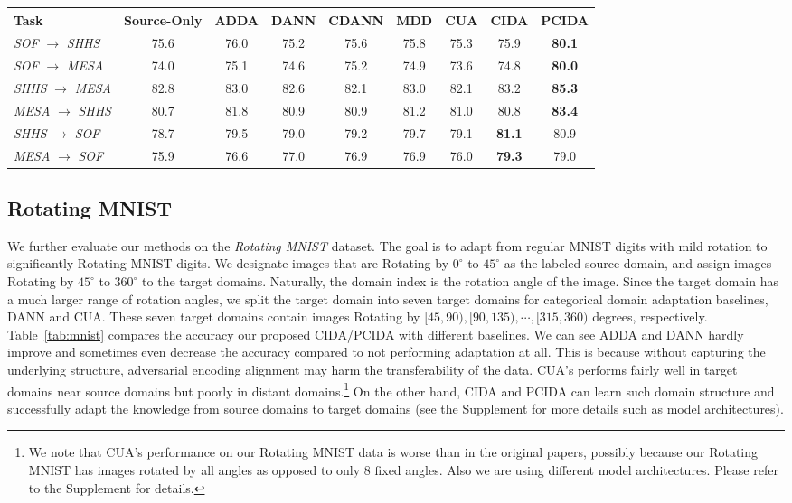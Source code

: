 \documentclass{article}
\newcommand{\tabref}[1]{Table~\ref{#1}}
\begin{document}
\begin{table*}[t]
\begin{footnotesize}
\begin{center}
\begin{tabular}{lcccccccc}
\hline
Task  & Source-Only  & ADDA & DANN & CDANN & MDD & CUA & CIDA & PCIDA \\
\hline
 \emph{SOF} $\rightarrow$ \emph{SHHS}
 & 75.6 & {76.0} & 75.2 & 75.6 & 75.8 & 75.3 & 75.9 & \textbf{80.1}  \\
  \emph{SOF} $\rightarrow$ \emph{MESA}
 & 74.0 & 75.1 & 74.6 & {75.2} & 74.9 & 73.6 & 74.8 & \textbf{80.0}  \\
  \emph{SHHS} $\rightarrow$ \emph{MESA}
 & 82.8& 83.0 & 82.6 & 82.1 & 83.0 & 82.1 & {83.2} & \textbf{85.3}  \\
  \emph{MESA} $\rightarrow$ \emph{SHHS}
 & 80.7 & {81.8} & 80.9 & 80.9 & 81.2 & 81.0 & 80.8 & \textbf{83.4}  \\
 \emph{SHHS} $\rightarrow$ \emph{SOF}
 & 78.7 & 79.5 & 79.0 & 79.2 & 79.7 & 79.1 & \textbf{81.1} & {80.9}  \\
 \emph{MESA} $\rightarrow$ \emph{SOF}
 & 75.9 & 76.6 & 77.0 & 76.9 & 76.9 & 76.0 & \textbf{79.3} & {79.0}  \\
 \hline
\end{tabular}
\end{center}
\vskip -0.7cm
\end{footnotesize}
\end{table*}


\subsection{Rotating MNIST}
We further evaluate our methods on the \emph{Rotating MNIST} dataset. The goal is to adapt from regular MNIST digits with mild rotation to significantly Rotating MNIST digits. We designate images that are Rotating by $0^\circ$ to $45^\circ$ as the labeled source domain, and assign images Rotating by $45^\circ$ to $360^\circ$ to the target domains. Naturally, the domain index is the rotation angle of the image. Since the target domain has a much larger range of rotation angles, we split the target domain into seven target domains for categorical domain adaptation baselines, DANN and CUA. These seven target domains contain images Rotating by $[45,90),[90,135),\cdots,[315,360)$ degrees, respectively. \tabref{tab:mnist} compares the accuracy our proposed CIDA/PCIDA with different baselines.
We can see ADDA and DANN hardly improve and sometimes even decrease the accuracy compared to not performing adaptation at all. This is because without capturing the underlying structure, adversarial encoding alignment may harm the transferability of the data. CUA's performs fairly well in target domains near source domains but poorly in distant domains.\footnote{We note that CUA's performance on our Rotating MNIST data is worse than in the original papers, possibly because our Rotating MNIST has images rotated by all angles as opposed to only $8$ fixed angles. Also we are using different model architectures. Please refer to the Supplement for details.} On the other hand, CIDA and PCIDA can learn such domain structure and successfully adapt the knowledge from source domains to target domains (see the Supplement for more details such as model architectures).
\end{document}
